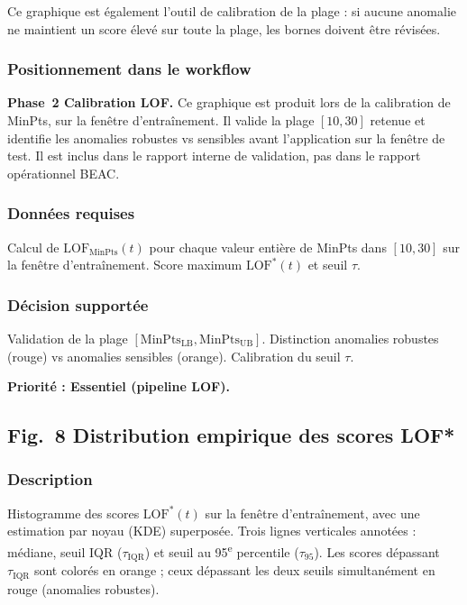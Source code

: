 \documentclass[12pt,a4paper]{article}
\begin{document}
Ce graphique est également l'outil de calibration de la plage : si aucune
anomalie ne maintient un score élevé sur toute la plage, les bornes doivent
être révisées.

\subsubsection{Positionnement dans le workflow}

\textbf{Phase~2  Calibration LOF.} Ce graphique est produit lors de la
calibration de MinPts, sur la fenêtre d'entraînement. Il valide la plage
$[10, 30]$ retenue et identifie les anomalies robustes vs sensibles avant
l'application sur la fenêtre de test. Il est inclus dans le rapport interne
de validation, pas dans le rapport opérationnel BEAC.

\subsubsection{Données requises}

Calcul de $\mathrm{LOF}_{\mathrm{MinPts}}(t)$ pour chaque valeur entière
de MinPts dans $[10, 30]$ sur la fenêtre d'entraînement. Score maximum
$\mathrm{LOF}^*(t)$ et seuil $\tau$.

\subsubsection{Décision supportée}

Validation de la plage $[\mathrm{MinPts}_{\mathrm{LB}},
\mathrm{MinPts}_{\mathrm{UB}}]$. Distinction anomalies robustes (rouge) vs
anomalies sensibles (orange). Calibration du seuil $\tau$.

\textbf{Priorité : Essentiel (pipeline LOF).}

\subsection{Fig.~8  Distribution empirique des scores LOF*}

\subsubsection{Description}

Histogramme des scores $\mathrm{LOF}^*(t)$ sur la fenêtre d'entraînement,
avec une estimation par noyau (KDE) superposée. Trois lignes verticales
annotées : médiane, seuil IQR ($\tau_{\mathrm{IQR}}$) et seuil au
95\textsuperscript{e} percentile ($\tau_{95}$). Les scores dépassant
$\tau_{\mathrm{IQR}}$ sont colorés en orange ; ceux dépassant les deux
seuils simultanément en rouge (anomalies robustes).
\end{document}
